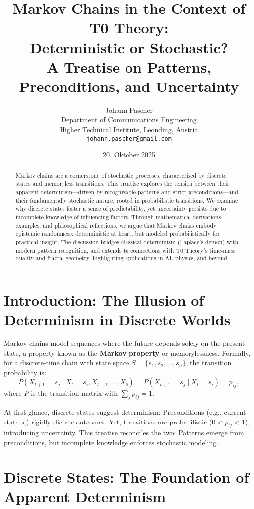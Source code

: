 \documentclass[12pt,a4paper]{article}
\title{Markov Chains in the Context of T0 Theory:\\Deterministic or Stochastic?\\A Treatise on Patterns, Preconditions, and Uncertainty}
\author{Johann Pascher\\
	Department of Communications Engineering\\
	Higher Technical Institute, Leonding, Austria\\
	\texttt{johann.pascher@gmail.com}}
\date{20. Oktober 2025}
\begin{document}
	
	\maketitle
	
	\begin{abstract}
		Markov chains are a cornerstone of stochastic processes, characterized by discrete states and memoryless transitions. This treatise explores the tension between their apparent determinism—driven by recognizable patterns and strict preconditions—and their fundamentally stochastic nature, rooted in probabilistic transitions. We examine why discrete states foster a sense of predictability, yet uncertainty persists due to incomplete knowledge of influencing factors. Through mathematical derivations, examples, and philosophical reflections, we argue that Markov chains embody epistemic randomness: deterministic at heart, but modeled probabilistically for practical insight. The discussion bridges classical determinism (Laplace's demon) with modern pattern recognition, and extends to connections with T0 Theory's time-mass duality and fractal geometry, highlighting applications in AI, physics, and beyond.
	\end{abstract}
	
	\tableofcontents
	
	\section{Introduction: The Illusion of Determinism in Discrete Worlds}
	\label{sec:intro}
	
	Markov chains model sequences where the future depends solely on the present state, a property known as the \textbf{Markov property} or memorylessness. Formally, for a discrete-time chain with state space $S = \{s_1, s_2, \dots, s_n\}$, the transition probability is:
	\begin{equation}
		P(X_{t+1} = s_j \mid X_t = s_i, X_{t-1}, \dots, X_0) = P(X_{t+1} = s_j \mid X_t = s_i) = p_{ij},
	\end{equation}
	where $P$ is the transition matrix with $\sum_j p_{ij} = 1$.
	
	At first glance, discrete states suggest determinism: Preconditions (e.g., current state $s_i$) rigidly dictate outcomes. Yet, transitions are probabilistic ($0 < p_{ij} < 1$), introducing uncertainty. This treatise reconciles the two: Patterns emerge from preconditions, but incomplete knowledge enforces stochastic modeling.
	
	\section{Discrete States: The Foundation of Apparent Determinism}
	\label{sec:discrete}
	
\end{document}
